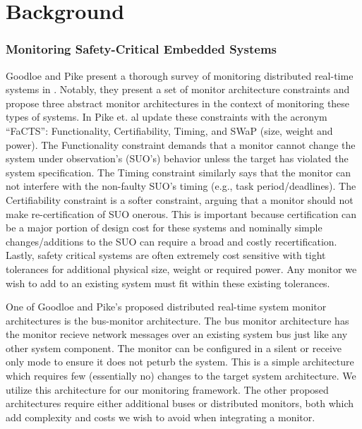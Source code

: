 
\section{Background}

\subsubsection{Monitoring Safety-Critical Embedded Systems}
\label{sec:bg:sc_monitor}
Goodloe and Pike present a thorough survey of monitoring distributed real-time systems in \cite{Goodloe2010}. Notably, they present a set of monitor architecture constraints and propose three abstract monitor architectures in the context of monitoring these types of systems.
%
In \cite{Pike2011} Pike et. al update these constraints with the acronym ``FaCTS'': Functionality, Certifiability, Timing, and SWaP (size, weight and power). 
The Functionality constraint demands that a monitor cannot change the system under observation's (SUO's) behavior unless the target has violated the system specification. 
The Timing constraint similarly says that the monitor can not interfere with the non-faulty SUO's timing (e.g., task period/deadlines).
The Certifiability constraint is a softer constraint, arguing that a monitor should not make re-certification of SUO onerous. This is important because certification can be a major portion of design cost for these systems and nominally simple changes/additions to the SUO can require a broad and costly recertification.
Lastly, safety critical systems are often extremely cost sensitive with tight tolerances for additional physical size, weight or required power. Any monitor we wish to add to an existing system must fit within these existing tolerances.

One of Goodloe and Pike's proposed distributed real-time system monitor architectures is the bus-monitor architecture.
The bus monitor architecture has the monitor recieve network messages over an existing system bus just like any other system component. 
The monitor can be configured in a silent or receive only mode to ensure it does not peturb the system. 
This is a simple architecture which requires few (essentially no) changes to the target system architecture. We utilize this architecture for our monitoring framework. The other proposed architectures require either additional buses or distributed monitors, both which add complexity and costs we wish to avoid when integrating a monitor. %

